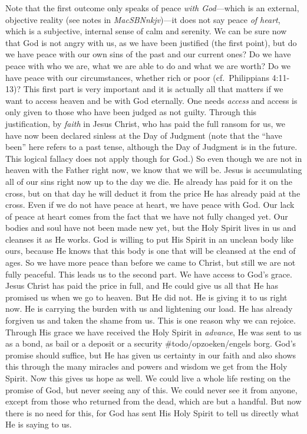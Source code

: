 Note that the first outcome only speaks of peace \emph{with God}---which
is an external, objective reality (see notes in \emph{MacSBNnkjv})---it
does not say peace \emph{of heart}, which is a subjective, internal
sense of calm and serenity. We can be sure now that God is not angry
with us, as we have been justified (the first point), but do we have
peace with our own sins of the past and our current ones? Do we have
peace with who we are, what we are able to do and what we are worth? Do
we have peace with our circumstances, whether rich or poor
(cf.~Philippians 4:11-13)? This first part is very important and it is
actually all that matters if we want to access heaven and be with God
eternally. One needs \emph{access} and access is only given to those who
have been judged as not guilty. Through this justification, by
\emph{faith} in Jesus Christ, who has paid the full ransom for us, we
have now been declared sinless at the Day of Judgment (note that the
``have been'' here refers to a past tense, although the Day of Judgment
is in the future. This logical fallacy does not apply though for God.)
So even though we are not in heaven with the Father right now, we know
that we will be. Jesus is accumulating all of our sins right now up to
the day we die. He already has paid for it on the cross, but on that day
he will deduct it from the price He has already paid at the cross. Even
if we do not have peace at heart, we have peace with God. Our lack of
peace at heart comes from the fact that we have not fully changed yet.
Our bodies and soul have not been made new yet, but the Holy Spirit
lives in us and cleanses it as He works. God is willing to put His
Spirit in an unclean body like ours, because He knows that this body is
one that will be cleansed at the end of ages. So we have more peace than
before we came to Christ, but still we are not fully peaceful. This
leads us to the second part. We have access to God's grace. Jesus Christ
has paid the price in full, and He could give us all that He has
promised us when we go to heaven. But He did not. He is giving it to us
right now. He is carrying the burden with us and lightening our load. He
has already forgiven us and taken the shame from us. This is one reason
why we can rejoice. Through His grace we have received the Holy Spirit
in \emph{advance}, He was sent to us as a bond, as bail or a deposit or
a security \#todo/opzoeken/engels borg. God's promise should suffice,
but He has given us certainty in our faith and also shows this through
the many miracles and powers and wisdom we get from the Holy Spirit. Now
this gives us hope as well. We could live a whole life resting on the
promise of God, but never seeing any of this. We could never see it from
anyone, except from those who returned from the dead, which are but a
handful. But now there is no need for this, for God has sent His Holy
Spirit to tell us directly what He is saying to us.

